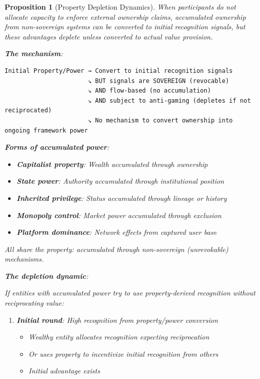 \documentclass[11pt,a4paper]{article}
\newtheorem{proposition}[theorem]{Proposition}
\theoremstyle{definition}
\theoremstyle{remark}
\begin{document}
\begin{proposition}[Property Depletion Dynamics]
When participants do not allocate capacity to enforce external ownership claims, accumulated ownership from non-sovereign systems can be converted to initial recognition signals, but these advantages deplete unless converted to actual value provision.

\textbf{The mechanism}:

\begin{center}
\begin{verbatim}
Initial Property/Power → Convert to initial recognition signals
                       ↘ BUT signals are SOVEREIGN (revocable)
                       ↘ AND flow-based (no accumulation)
                       ↘ AND subject to anti-gaming (depletes if not reciprocated)
                       ↘ No mechanism to convert ownership into ongoing framework power
\end{verbatim}
\end{center}

\textbf{Forms of accumulated power}:
\begin{itemize}
\item \textbf{Capitalist property}: Wealth accumulated through ownership
\item \textbf{State power}: Authority accumulated through institutional position
\item \textbf{Inherited privilege}: Status accumulated through lineage or history
\item \textbf{Monopoly control}: Market power accumulated through exclusion
\item \textbf{Platform dominance}: Network effects from captured user base
\end{itemize}

All share the property: accumulated through non-sovereign (unrevokable) mechanisms.

\textbf{The depletion dynamic}:

If entities with accumulated power try to use property-derived recognition without reciprocating value:

\begin{enumerate}
\item \textbf{Initial round}: High recognition from property/power conversion
\begin{itemize}
\item Wealthy entity allocates recognition expecting reciprocation
\item Or uses property to incentivize initial recognition from others
\item Initial advantage exists
\end{itemize}


\end{enumerate}
\end{proposition}
\end{document}
